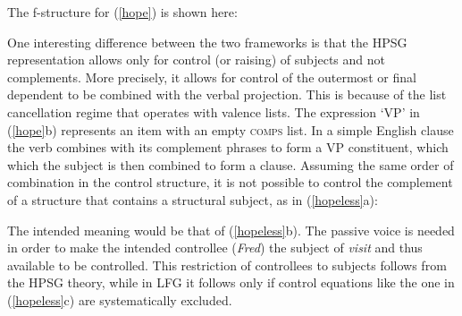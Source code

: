 The f-structure for (\ref{hope}) is shown here:

\begin{exe}
\ex \label{hopefs} 
{
}
\end{exe}

\noindent
One interesting difference between the two frameworks is that the HPSG representation allows only for control (or raising) of subjects and not complements.  More precisely, it allows for control of the outermost or final dependent to be combined with the verbal projection.  This is because of the list cancellation regime that operates with valence lists.  The expression `VP' in  (\ref{hope}b) represents an item with an empty \textsc{comps} list.  In a simple English clause the verb combines with its complement phrases to form a VP constituent, which which the subject is then combined to form a clause.  Assuming the same order of combination in the control structure, it is not possible to control the complement of a structure that contains a structural subject, as in (\ref{hopeless}a):

\begin{exe} 
\ex 
\label{hopeless}
\begin{xlist}
\end{xlist}
\end{exe}
The intended meaning would be that of (\ref{hopeless}b).  The passive voice is needed in order to make the intended controllee (\textit{Fred})  the subject of \textit{visit} and thus available to be controlled.  This restriction of controllees to subjects follows from the HPSG theory, while in LFG it follows only if control equations  
 like the one in (\ref{hopeless}c) are systematically excluded.    

